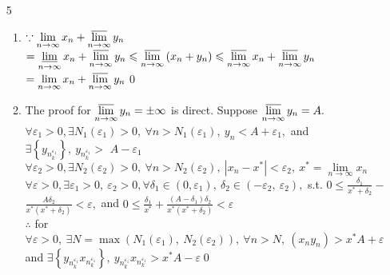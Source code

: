 \begin{enumerate}[1]
	\item[5]

\begin{enumerate}[(1)]
	\item 
	\(\because \lim \limits_{n \rightarrow \infty} x_{n}+\varlimsup \limits_{n \rightarrow \infty} y_{n} \)\\
	\(= \varliminf \limits_{n \rightarrow \infty} x_{n}+\varlimsup \limits_{n \rightarrow \infty} y_{n} \leqslant \varlimsup \limits_{n \rightarrow \infty}\left(x_{n}+y_{n}\right) \leqslant \varlimsup \limits_{n \rightarrow \infty} x_{n}+\varlimsup \limits_{n \rightarrow \infty} y_{n}\)\\
	\(=\lim \limits_{n \rightarrow \infty} x_{n}+ \varlimsup \limits_{n \rightarrow \infty} y_{n}\)\qed

	\item 
	The proof for \(\varlimsup \limits_{n \rightarrow \infty} y_{n}=\pm \infty\) is direct. Suppose \(\varlimsup \limits_{n \rightarrow \infty} y_{n}=A .\)\\
	\(\forall \varepsilon_{1}>0, \exists N_{1}\left(\varepsilon_{1}\right)>0,\  \forall n>N_{1}\left(\varepsilon_{1}\right),\  y_{n}<A+\varepsilon_{1},\) and \(\exists\left\{y_{n_{k}^{\varepsilon_{1}}}\right\},\  y_{n_{k}^{\varepsilon_{1}}}>\)	\(A-\varepsilon_{1}\)\\
	\(\forall \varepsilon_{2}>0, \exists N_{2}\left(\varepsilon_{2}\right)>0,\  \forall n>N_{2}\left(\varepsilon_{2}\right),\ \left|x_{n}-x^{*}\right|<\varepsilon_{2},\  x^{*}=\lim \limits_{n \rightarrow \infty} x_{n}\)\\
	\(\forall \varepsilon>0, \exists \varepsilon_{1}>0,\  \varepsilon_{2}>0, \forall \delta_{1} \in\left(0, \varepsilon_{1}\right),\  \delta_{2} \in\left(-\varepsilon_{2}, \ \varepsilon_{2}\right),\) s.t. \(0 \leqslant \frac{\delta_{1}}{x^{*}+\delta_{2}}-\)
	\(\frac{A \delta_{2}}{x^{*}\left(x^{*}+\delta_{2}\right)}<\varepsilon,\) and \(0 \leqslant \frac{\delta_{1}}{x^{*}}+\frac{\left(A-\delta_{1}\right) \delta_{2}}{x^{*}\left(x^{*}+\delta_{2}\right)}<\varepsilon\)\\
	\(\therefore\) for \(\forall \varepsilon>0,\  \exists N=\max \left(N_{1}\left(\varepsilon_{1}\right),\  N_{2}\left(\varepsilon_{2}\right)\right),\  \forall n>N,\ \left(x_{n} y_{n}\right)>x^{*} A+\varepsilon\) \\
	and \(\exists\left\{y_{n_{k}^{\varepsilon_{1}}} x_{n_{k}^{\varepsilon_{1}}}\right\},\  y_{n_{k}^{\varepsilon_{1}}} x_{n_{k}^{\varepsilon_{1}}}>x^{*} A-\varepsilon\)\qed
\end{enumerate}


\end{enumerate}
